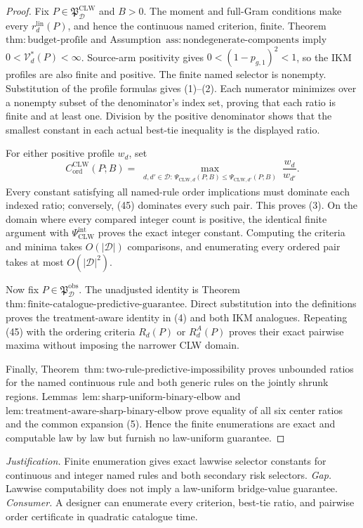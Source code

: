 \documentclass{article}
\begin{document}
\begin{proof}
Fix \(P\in\mathfrak P_{\mathcal D}^{\mathrm{CLW}}\) and \(B>0\).  The moment and full-Gram conditions make every \(r_d^{\mathrm{lin}}(P)\), and hence the continuous named criterion, finite.  Theorem~\(\mathrm{thm{:}budget\text{-}profile}\) and Assumption~\(\mathrm{ass{:}nondegenerate\text{-}components}\) imply \(0<\mathcal V_d^*(P)<\infty\).  Source-arm positivity gives \(0<(1-p_{g,1})^2<1\), so the IKM profiles are also finite and positive.  The finite named selector is nonempty.  Substitution of the profile formulas gives (1)--(2).  Each numerator minimizes over a nonempty subset of the denominator's index set, proving that each ratio is finite and at least one.  Division by the positive denominator shows that the smallest constant in each actual best-tie inequality is the displayed ratio.

For either positive profile \(w_d\), set
\[
 C_{\mathrm{ord}}^{\mathrm{CLW}}(P;B)
 =\max_{\substack{d,d'\in\mathcal D:\,
 \Psi_{\mathrm{CLW},d}(P;B)
 \le\Psi_{\mathrm{CLW},d'}(P;B)}}\frac{w_d}{w_{d'}}.       \tag{45}
\]
Every constant satisfying all named-rule order implications must dominate each indexed ratio; conversely, (45) dominates every such pair.  This proves (3).  On the domain where every compared integer count is positive, the identical finite argument with \(\Psi_{\mathrm{CLW}}^{\mathrm{int}}\) proves the exact integer constant.  Computing the criteria and minima takes \(O(|\mathcal D|)\) comparisons, and enumerating every ordered pair takes at most \(O(|\mathcal D|^2)\).

Now fix \(P\in\mathfrak P_{\mathcal D}^{\mathrm{obs}}\).  The unadjusted identity is Theorem~\(\mathrm{thm{:}finite\text{-}catalogue\text{-}predictive\text{-}guarantee}\).  Direct substitution into the definitions proves the treatment-aware identity in (4) and both IKM analogues.  Repeating (45) with the ordering criteria \(R_d(P)\) or \(R_d^A(P)\) proves their exact pairwise maxima without imposing the narrower CLW domain.

Finally, Theorem~\(\mathrm{thm{:}two\text{-}rule\text{-}predictive\text{-}impossibility}\) proves unbounded ratios for the named continuous rule and both generic rules on the jointly shrunk regions.  Lemmas~\(\mathrm{lem{:}sharp\text{-}uniform\text{-}binary\text{-}elbow}\) and \(\mathrm{lem{:}treatment\text{-}aware\text{-}sharp\text{-}binary\text{-}elbow}\) prove equality of all six center ratios and the common expansion (5).  Hence the finite enumerations are exact and computable law by law but furnish no law-uniform guarantee.
\end{proof}
\par\smallskip\noindent \textit{Justification.} Finite enumeration gives exact lawwise selector constants for continuous and integer named rules and both secondary risk selectors. \textit{Gap.} Lawwise computability does not imply a law-uniform bridge-value guarantee. \textit{Consumer.} A designer can enumerate every criterion, best-tie ratio, and pairwise order certificate in quadratic catalogue time.
\end{document}
